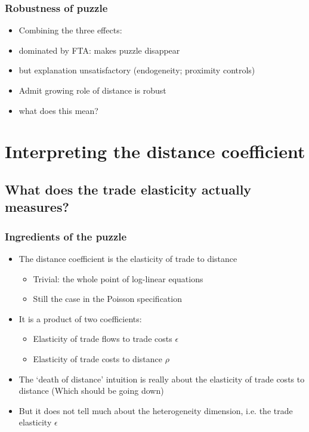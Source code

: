 \documentclass{beamer}
\begin{document}
\begin{frame}[plain]\frametitle{Robustness of puzzle}
\vspace{0.3cm}
\begin{itemize}
\item Combining the three effects:
\item dominated by FTA: makes puzzle disappear
\item but explanation unsatisfactory (endogeneity; proximity controls)
\vspace{.3cm}
\item Admit growing role of distance is robust
\item what does this mean?
\end{itemize}
\end{frame}
\fi

\section{Interpreting the distance coefficient}
\subsection{What does the trade elasticity actually measures?}
\begin{frame}\frametitle{Ingredients of the puzzle}
\begin{itemize}
\vspace{0.3cm}
\item The distance coefficient is the elasticity of trade to distance
\begin{itemize}
\item Trivial: the whole point of log-linear equations
\item Still the case in the Poisson specification
\end{itemize}
\vspace{0.3cm}
\item It is a product of two coefficients:
\begin{itemize}
\item Elasticity of trade flows to trade costs $\epsilon$
\item Elasticity of trade costs to distance $\rho$
\end{itemize}
\vspace{0.3cm}
\item The `death of distance' intuition is really about the elasticity of trade costs to distance (Which should be going down)
\item But it does not tell much about the heterogeneity dimension, i.e. the trade elasticity $\epsilon$
\end{itemize}
\end{frame}
\end{document}
